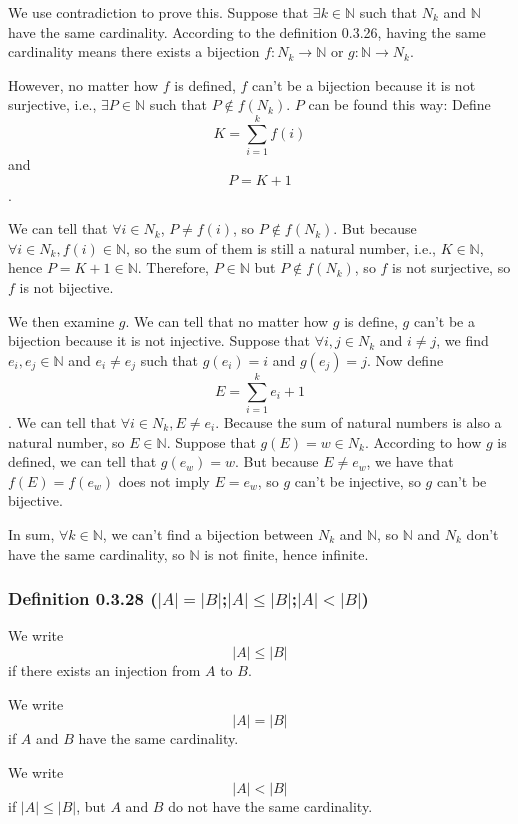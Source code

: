 \documentclass[12pt, letterpaper, oneside]{book}
\begin{document}
We use contradiction to prove this. Suppose that $\exists k \in \mathbb{N}$
such that $N_k$ and $\mathbb{N}$ have the same cardinality. According to the
definition 0.3.26, having the same cardinality means there exists a bijection
$f: N_k \rightarrow \mathbb{N}$ or $g: \mathbb{N} \rightarrow N_k$.

However, no matter how $f$ is defined, $f$ can't be a bijection because it is
not surjective, i.e., $\exists P \in \mathbb{N}$ such that $P \notin f(N_k)$.
$P$ can be found this way: Define \[K = \sum_{i=1}^{k} f(i) \] and \[P = K +
  1\].

We can tell that $\forall i \in N_k$, $P \neq f(i)$, so $P \notin f(N_k)$. But
because $\forall i \in N_k, f(i) \in \mathbb{N}$, so the sum of them is still
a natural number, i.e., $K \in \mathbb{N}$, hence $P = K + 1 \in \mathbb{N}$.
Therefore, $P \in \mathbb{N}$ but $P \notin f(N_k)$, so $f$ is not surjective,
so $f$ is not bijective.

We then examine $g$. We can tell that no matter how $g$ is define, $g$ can't be
a bijection because it is not injective. Suppose that $\forall i, j \in N_k$
and $i \neq j$, we find $e_i, e_j \in \mathbb{N}$ and $e_i \neq e_j$ such that
$g(e_i) = i$ and $g(e_j) = j$. Now define \[E = \sum_{i=1}^{k} e_i + 1\]. We
can tell that $\forall i \in N_k, E \neq e_i$. Because the sum of natural
numbers is also a natural number, so $E \in \mathbb{N}$. Suppose that $g(E) = w
  \in N_k$. According to how $g$ is defined, we can tell that $g(e_w) = w$. But
because $E \neq e_w$, we have that $f(E) = f(e_w)$ does not imply $E = e_w$, so
$g$ can't be injective, so $g$ can't be bijective.

In sum, $\forall k \in \mathbb{N}$, we can't find a bijection between $N_k$ and
$\mathbb{N}$, so $\mathbb{N}$ and $N_k$ don't have the same cardinality, so
$\mathbb{N}$ is not finite, hence infinite.

\subsubsection{Definition 0.3.28 ($|A|=|B|$;$|A| \leq |B|$;$|A|<|B|$)}

We write \[|A| \leq |B|\] if there exists an injection from $A$ to $B$.

We write \[|A| = |B|\] if $A$ and $B$ have the same cardinality.

We write \[|A| < |B|\] if $|A| \leq |B|$, but $A$ and $B$ do not have the same
cardinality.
\end{document}
